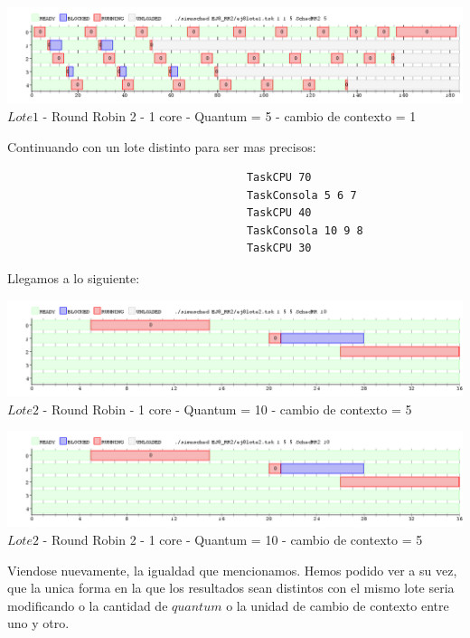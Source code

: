  \begin{center}
    	\includegraphics[width=450pt]{./EJ8_RR2/dif1corerr2.png}
	{$Lote 1$ - Round Robin 2 - 1 core - Quantum = 5 - cambio de contexto = 1}	
 \end{center}

Continuando con un lote distinto para ser mas precisos:

 \begin{verbatim}
                                     TaskCPU 70
                                     TaskConsola 5 6 7
                                     TaskCPU 40
                                     TaskConsola 10 9 8
                                     TaskCPU 30
 \end{verbatim}
 
Llegamos a lo siguiente:\\

 \begin{center}
    	\includegraphics[width=450pt]{./EJ8_RR2/dif2corerr.png}
	{$Lote 2$ - Round Robin - 1 core - Quantum = 10 - cambio de contexto = 5}	
 \end{center}
 
 \begin{center}
    	\includegraphics[width=450pt]{./EJ8_RR2/dif2corerr2.png}
	{$Lote 2$ - Round Robin 2 - 1 core - Quantum = 10 - cambio de contexto = 5}	
 \end{center}
 
 Viendose nuevamente, la igualdad que mencionamos. Hemos podido ver a su vez, que la unica
 forma en la que los resultados sean distintos con el mismo lote seria modificando o la
 cantidad de $quantum$ o la unidad de cambio de contexto entre uno y otro.\\
 
